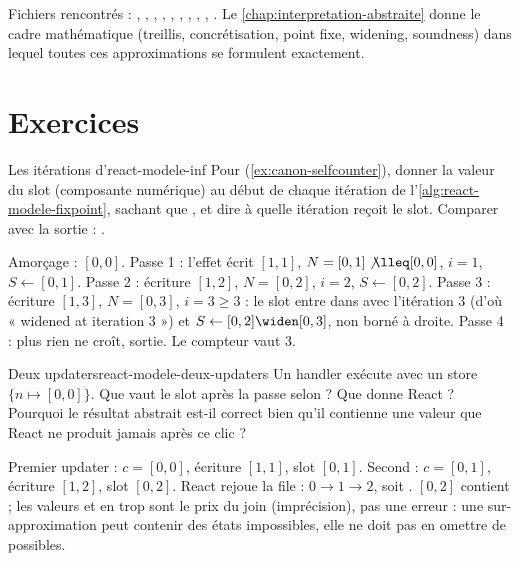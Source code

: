 \begin{resume}
\begin{itemize}
\end{itemize}
{\raggedright Fichiers rencontrés : ,
, ,
, ,
, ,
, ,
. Le \cref{chap:interpretation-abstraite}
donne le cadre mathématique (treillis, concrétisation, point fixe, widening,
soundness) dans lequel toutes ces approximations se formulent exactement.\par}
\end{resume}

\section*{Exercices}

\begin{exercice}{Les itérations d'}{react-modele-inf}
Pour  (\cref{ex:canon-selfcounter}), donner la valeur du slot
 (composante numérique) au début de chaque itération de
l'\cref{alg:react-modele-fixpoint}, sachant que , et
dire à quelle itération  reçoit le slot. Comparer avec la
sortie  : .
\end{exercice}
\begin{solution}
Amorçage : $[0,0]$. Passe 1 : l'effet écrit $[1,1]$, $N = [0,1] \not\lleq [0,0]$,
$i = 1$, $S \leftarrow [0,1]$. Passe 2 : écriture $[1,2]$, $N = [0,2]$, $i = 2$,
$S \leftarrow [0,2]$. Passe 3 : écriture $[1,3]$, $N = [0,3]$, $i = 3 \geq 3$ :
le slot entre dans  avec l'itération 3 (d'où « widened at
iteration 3 ») et $S \leftarrow [0,2] \widen [0,3]$, non borné à droite. Passe
4 : plus rien ne croît, sortie. Le compteur vaut 3.
\end{solution}

\begin{exercice}{Deux updaters}{react-modele-deux-updaters}
Un handler exécute  avec un
store $\{n \mapsto [0,0]\}$. Que vaut le slot après la passe selon
 ? Que donne React ? Pourquoi le résultat abstrait
est-il correct bien qu'il contienne une valeur que React ne produit jamais
après ce clic ?
\end{exercice}
\begin{solution}
Premier updater : $c = [0,0]$, écriture $[1,1]$, slot $[0,1]$. Second :
$c = [0,1]$, écriture $[1,2]$, slot $[0,2]$. React rejoue la file :
$0 \to 1 \to 2$, soit . $[0,2]$ contient  ; les valeurs 
et  en trop sont le prix du join (imprécision), pas une erreur : une
sur-approximation peut contenir des états impossibles, elle ne doit pas en
omettre de possibles.
\end{solution}

